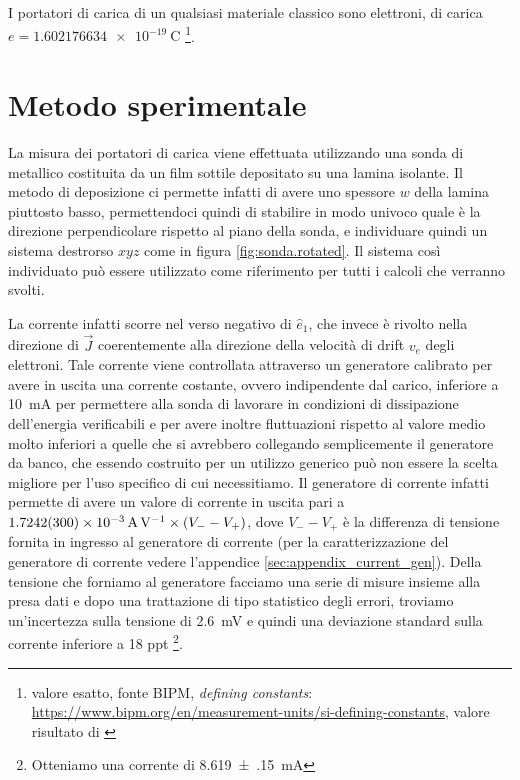 \documentclass[
    prl,
    reprint, 
    superscriptaddress, 
    altaffilletter, 
    amsmath, 
    amssymb, 
    a4paper,
    varvw]{revtex4-2}
\begin{document}
I portatori di carica di un qualsiasi materiale classico sono elettroni, di carica $e=\SI{1.602176634e-19}{\coulomb}$ \footnote{valore esatto, fonte BIPM, \emph{defining constants}: \url{https://www.bipm.org/en/measurement-units/si-defining-constants}, valore risultato di \cite{Newell_2018}}. 

\section{Metodo sperimentale}
La misura dei portatori di carica viene effettuata utilizzando una sonda di  metallico costituita da un film sottile depositato su una lamina isolante. Il metodo di deposizione ci permette infatti di avere uno spessore $w$ della lamina piuttosto basso, permettendoci quindi di stabilire in modo univoco quale è la direzione perpendicolare rispetto al piano della sonda, e individuare quindi un sistema destrorso $xyz$ come in figura \ref{fig:sonda.rotated}. Il sistema così individuato può essere utilizzato come riferimento per tutti i calcoli che verranno svolti.

La corrente infatti scorre nel verso negativo di $\hat{e}_1$, che invece è rivolto nella direzione di $\vec{J}$ coerentemente alla direzione della velocità di drift $v_e$ degli elettroni. Tale corrente viene controllata attraverso un generatore calibrato per avere in uscita una corrente costante, ovvero indipendente dal carico, inferiore a \SI{10}{\milli\ampere} per permettere alla sonda di lavorare in condizioni di dissipazione dell'energia verificabili e per avere inoltre fluttuazioni rispetto al valore medio molto inferiori a quelle che si avrebbero collegando semplicemente il generatore da banco, che essendo costruito per un utilizzo generico può non essere la scelta migliore per l'uso specifico di cui necessitiamo. Il generatore di corrente infatti permette di avere un valore di corrente in uscita pari a $\SI{1.7242(300)e-3}{\ampere\per\volt}\times\qty(V_--V_+)$, dove $V_--V_+$ è la differenza di tensione fornita in ingresso al generatore di corrente (per la caratterizzazione del generatore di corrente vedere l'appendice \ref{sec:appendix_current_gen}). Della tensione che forniamo al generatore facciamo una serie di misure insieme alla presa dati e dopo una trattazione di tipo statistico degli errori, troviamo un'incertezza sulla tensione di \SI{2.6}{\milli\volt} e quindi una deviazione standard sulla corrente inferiore a 18 ppt \footnote{Otteniamo una corrente di \SI[separate-uncertainty=true]{8.619(150)}{\milli\ampere}}. 
\end{document}
